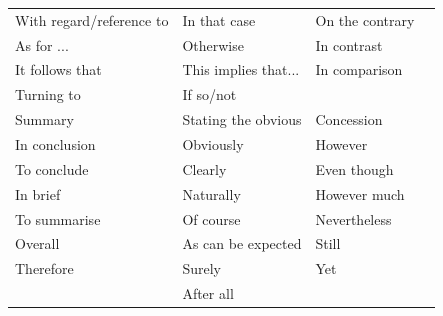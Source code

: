 \begin{tabular}{ | l | l | l | l |}
With regard/reference to & In that case & On the contrary \\
As for ... & Otherwise & In contrast \\
It follows that & This implies that... & In comparison \\
Turning to & If so/not \\
\hline
Summary & Stating the obvious & Concession \\
\hline
In conclusion & Obviously & However \\
To conclude & Clearly & Even though \\
In brief & Naturally & However much \\
To summarise & Of course & Nevertheless \\
Overall & As can be expected & Still \\
Therefore & Surely & Yet \\
& After all \\
\hline
\end{tabular}
    
